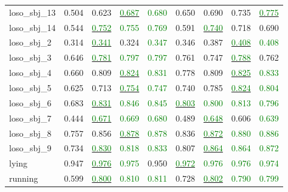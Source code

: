 \begin{table}[t]
\begin{tabularx}{\linewidth}{@{}>{\raggedright\arraybackslash}X cccc @{\hspace{1.5em}} cccc@{}}
    loso_sbj_13 & 0.504 & 0.623 & \underline{\textcolor{green}{0.687}} & \textcolor{green}{0.680} & 0.650 & 0.690 & 0.735 & \underline{\textcolor{green}{0.775}} \\
    loso_sbj_14 & 0.544 & \underline{\textcolor{green}{0.752}} & \textcolor{green}{0.755} & \textcolor{green}{0.769} & 0.591 & \underline{\textcolor{green}{0.740}} & 0.718 & 0.690 \\
    loso_sbj_2 & 0.314 & \underline{\textcolor{green}{0.341}} & 0.324 & \textcolor{green}{0.347} & 0.346 & 0.387 & \underline{\textcolor{green}{0.408}} & \textcolor{green}{0.408} \\
    loso_sbj_3 & 0.646 & \underline{\textcolor{green}{0.781}} & \textcolor{green}{0.797} & \textcolor{green}{0.797} & 0.761 & 0.747 & \underline{\textcolor{green}{0.788}} & 0.762 \\
    loso_sbj_4 & 0.660 & 0.809 & \underline{\textcolor{green}{0.824}} & \textcolor{green}{0.831} & 0.778 & 0.809 & \underline{\textcolor{green}{0.825}} & \textcolor{green}{0.833} \\
    loso_sbj_5 & 0.625 & 0.713 & \underline{\textcolor{green}{0.754}} & \textcolor{green}{0.747} & 0.740 & 0.785 & \underline{\textcolor{green}{0.824}} & \textcolor{green}{0.804} \\
    loso_sbj_6 & 0.683 & \underline{\textcolor{green}{0.831}} & \textcolor{green}{0.846} & \textcolor{green}{0.845} & \underline{\textcolor{green}{0.803}} & \textcolor{green}{0.800} & \textcolor{green}{0.813} & \textcolor{green}{0.796} \\
    loso_sbj_7 & 0.444 & \underline{\textcolor{green}{0.671}} & \textcolor{green}{0.669} & \textcolor{green}{0.680} & 0.489 & \underline{\textcolor{green}{0.648}} & 0.606 & \textcolor{green}{0.639} \\
    loso_sbj_8 & 0.757 & 0.856 & \underline{\textcolor{green}{0.878}} & \textcolor{green}{0.878} & 0.836 & \underline{\textcolor{green}{0.872}} & \textcolor{green}{0.880} & \textcolor{green}{0.886} \\
    loso_sbj_9 & 0.734 & \underline{\textcolor{green}{0.830}} & \textcolor{green}{0.818} & \textcolor{green}{0.833} & 0.807 & \underline{\textcolor{green}{0.864}} & \textcolor{green}{0.864} & \textcolor{green}{0.872} \\
    lying & 0.947 & \underline{\textcolor{green}{0.976}} & \textcolor{green}{0.975} & 0.950 & \underline{\textcolor{green}{0.972}} & \textcolor{green}{0.976} & \textcolor{green}{0.976} & \textcolor{green}{0.974} \\
    running & 0.599 & \underline{\textcolor{green}{0.800}} & \textcolor{green}{0.810} & \textcolor{green}{0.811} & 0.728 & \underline{\textcolor{green}{0.802}} & \textcolor{green}{0.790} & \textcolor{green}{0.799} \\

\end{tabularx}
\end{table}
